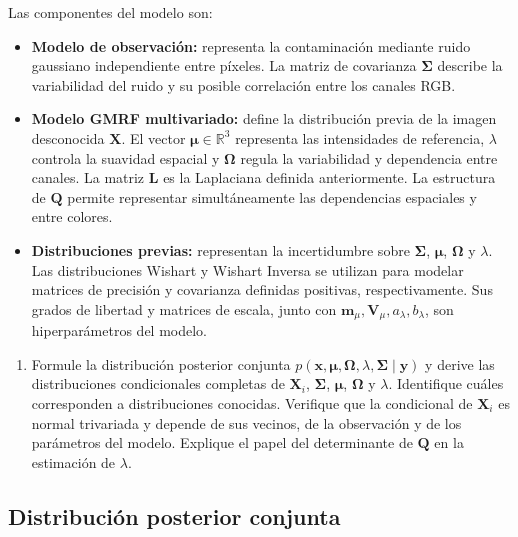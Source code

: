 \documentclass[11pt,a4paper]{article}
\begin{document}
Las componentes del modelo son:
\begin{itemize}
    \item \textbf{Modelo de observación:} representa la contaminación mediante ruido gaussiano independiente entre píxeles. La matriz de covarianza $\mathbf{\Sigma}$ describe la variabilidad del ruido y su posible correlación entre los canales RGB.
    \item \textbf{Modelo GMRF multivariado:} define la distribución previa de la imagen desconocida $\boldsymbol{X}$. El vector $\boldsymbol{\mu} \in \mathbb{R}^3$ representa las intensidades de referencia, $\lambda$ controla la suavidad espacial y $\mathbf{\Omega}$ regula la variabilidad y dependencia entre canales. La matriz $\mathbf{L}$ es la Laplaciana definida anteriormente. La estructura de $\mathbf{Q}$ permite representar simultáneamente las dependencias espaciales y entre colores.
    \item \textbf{Distribuciones previas:} representan la incertidumbre sobre $\mathbf{\Sigma}$, $\boldsymbol{\mu}$, $\mathbf{\Omega}$ y $\lambda$. Las distribuciones Wishart y Wishart Inversa se utilizan para modelar matrices de precisión y covarianza definidas positivas, respectivamente. Sus grados de libertad y matrices de escala, junto con $\boldsymbol{m}_\mu, \mathbf{V}_\mu, a_\lambda, b_\lambda$, son hiperparámetros del modelo.
\end{itemize}

\begin{enumerate}[label=\arabic*.]
    \item Formule la distribución posterior conjunta $p(\boldsymbol{x}, \boldsymbol{\mu}, \mathbf{\Omega}, \lambda, \mathbf{\Sigma} \mid \boldsymbol{y})$ y derive las distribuciones condicionales completas de $\boldsymbol{X}_i$, $\mathbf{\Sigma}$, $\boldsymbol{\mu}$, $\mathbf{\Omega}$ y $\lambda$. Identifique cuáles corresponden a distribuciones conocidas. Verifique que la condicional de $\boldsymbol{X}_i$ es normal trivariada y depende de sus vecinos, de la observación y de los parámetros del modelo. Explique el papel del determinante de $\mathbf{Q}$ en la estimación de $\lambda$.
\end{enumerate}

\subsection{Distribución posterior conjunta}
\end{document}
